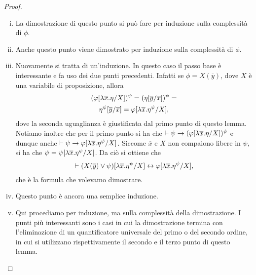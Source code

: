 \documentclass[]{marticle}
\begin{document}
\begin{proof}
    \begin{enumerate}[(i)]
        \item La dimostrazione di questo punto si pu\`o fare per induzione sulla
            complessit\`a di $\phi$.
        \item Anche questo punto viene dimostrato per induzione sulla
            complessit\`a di $\phi$. 
        \item Nuovamente si tratta di un'induzione. In questo caso il passo base
            \`e interessante e fa uso dei due punti precedenti. Infatti se
            $\phi=X(\overline{y})$, dove $X$ \`e una variabile di proposizione,
            allora 
            \begin{gather*}
                (\varphi[\lambda \overline{x}.\eta/X])^\psi  = 
                (\eta[\overline{y}/\overline{x}])^\psi = \\
                \eta^\psi[\overline{y}/\overline{x}]= 
                \varphi[\lambda \overline{x}.\eta^\psi/X],
            \end{gather*}
            dove la seconda uguaglianza \`e giustificata dal primo punto di
            questo lemma.  Notiamo inoltre che per il primo punto si ha che
            $\vdash \psi \rightarrow (\varphi[\lambda \overline{x}.\eta/X])^\psi$ e dunque
            anche $\vdash \psi \rightarrow \varphi[\lambda \overline{x}.\eta^\psi/X]$.
            Siccome $\overline{x}$ e $X$ non compaiono libere in $\psi$, si ha
            che $\psi = \psi [\lambda \overline{x}.\eta^\psi/X]$. Da ci\`o si
            ottiene che
            \begin{gather*}
                \vdash
                (X(\overline{y})
                \lor\psi)[\lambda \overline{x}.\eta ^\psi/X]
                \leftrightarrow \varphi [\lambda \overline{x}.\eta ^\psi/X],
            \end{gather*}
            che \`e la formula che volevamo dimostrare.
        \item Questo punto \`e ancora una semplice induzione.
        \item Qui procediamo per induzione, ma sulla complessit\`a della
            dimostrazione. I punti pi\`u interessanti sono i casi in cui la
            dimostrazione termina con l'eliminazione di un quantificatore
            universale del primo o del secondo ordine, in cui si utilizzano
            rispettivamente il secondo e il terzo punto di questo lemma.


\end{enumerate}
\end{proof}
\end{document}
